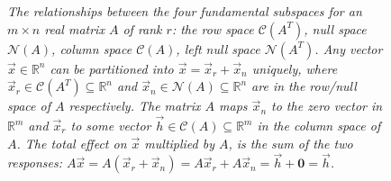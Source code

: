 \begin{figure}
    \caption{\textit{The relationships between the four fundamental subspaces for an $m \times n$ real matrix $A$ of rank $r$: the row space $\mathcal{C}(A^T)$, null space $\mathcal{N}(A)$, column space $\mathcal{C}(A)$, left null space $\mathcal{N}(A^T)$. Any vector $\vec{x} \in \mathbb{R}^n$ can be partitioned into $\vec{x} = \vec{x}_r + \vec{x}_n$ uniquely, where $\vec{x}_r \in \mathcal{C}(A^T) \subseteq \mathbb{R}^n$ and $\vec{x}_n \in \mathcal{N}(A) \subseteq \mathbb{R}^n$ are in the row/null space of $A$ respectively. The matrix $A$ maps $\vec{x}_n$ to the zero vector in $\mathbb{R}^m$ and $\vec{x}_r$ to some vector $\vec{h} \in \mathcal{C}(A) \subseteq \mathbb{R}^m$ in the column space of $A$. The total effect on $\vec{x}$ multiplied by $A$, is the sum of the two responses: $A\vec{x} = A(\vec{x}_r + \vec{x}_n) = A\vec{x}_r + A\vec{x}_n = \vec{h} + \textbf{0} = \vec{h}$.}}
    \label{fig:foursubspaces}
\end{figure}

